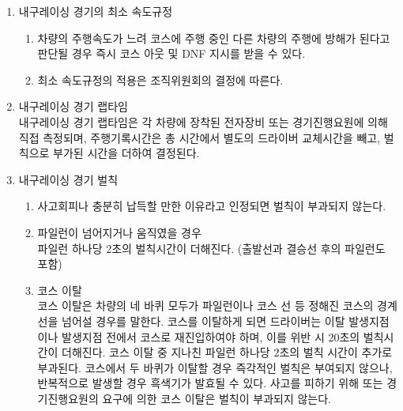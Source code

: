 \documentclass[final,a4paper,10pt]{report}
\begin{document}
{\begin{enumerate}
\begin{enumerate}
      \item\label{rule:formula-competition.endurance.breakdown-and-stoppage.two-member-track-removal} 차량이 정지하여 정비나 외부의 도움 없이 차량이 재출발이 불가능할 경우, 경기진행요원의 지시에 따라 두 명의 팀원이 차량을 트랙 밖으로 이동시켜야 한다.
    \end{enumerate}
  \item\label{rule:formula-competition.endurance.minimum-speed} 내구레이싱 경기의 최소 속도규정
    \begin{enumerate}
      \item\label{rule:formula-competition.endurance.minimum-speed.impedes-others-dnf} 차량의 주행속도가 느려 코스에 주행 중인 다른 차량의 주행에 방해가 된다고 판단될 경우 즉시 코스 아웃 및 DNF 지시를 받을 수 있다.
      \item\label{rule:formula-competition.endurance.minimum-speed.committee-discretion-applies} 최소 속도규정의 적용은 조직위원회의 결정에 따른다.
    \end{enumerate}
  \item\label{rule:formula-competition.endurance.lap-time-calculation} 내구레이싱 경기 랩타임\\
    내구레이싱 경기 랩타임은 각 차량에 장착된 전자장비 또는 경기진행요원에 의해 직접 측정되며, 주행기록시간은 총 시간에서 별도의 드라이버 교체시간을 빼고, 벌칙으로 부가된 시간을 더하여 결정된다.
  \item\label{rule:formula-competition.endurance.penalties} 내구레이싱 경기 벌칙
    \begin{enumerate}
      \item\label{rule:formula-competition.endurance.penalties.valid-reason-exemption} 사고회피나 충분히 납득할 만한 이유라고 인정되면 벌칙이 부과되지 않는다.
      \item\label{rule:formula-competition.endurance.penalties.cone-penalty-2s} 파일런이 넘어지거나 움직였을 경우\\
        파일런 하나당 2초의 벌칙시간이 더해진다. (출발선과 결승선 후의 파일런도 포함)
      \item\label{rule:formula-competition.endurance.penalties.course-departure-penalty} 코스 이탈\\
        코스 이탈은 차량의 네 바퀴 모두가 파일런이나 코스 선 등 정해진 코스의 경계선을 넘어설 경우를 말한다. 코스를 이탈하게 되면 드라이버는 이탈 발생지점이나 발생지점 전에서 코스로 재진입하여야 하며, 이를 위반 시 20초의 벌칙시간이 더해진다. 코스 이탈 중 지나친 파일런 하나당 2초의 벌칙 시간이 추가로 부과된다. 코스에서 두 바퀴가 이탈할 경우 즉각적인 벌칙은 부여되지 않으나, 반복적으로 발생할 경우 흑색기가 발효될 수 있다. 사고를 피하기 위해 또는 경기진행요원의 요구에 의한 코스 이탈은 벌칙이 부과되지 않는다.

\end{enumerate}
\end{enumerate}}
\end{document}
